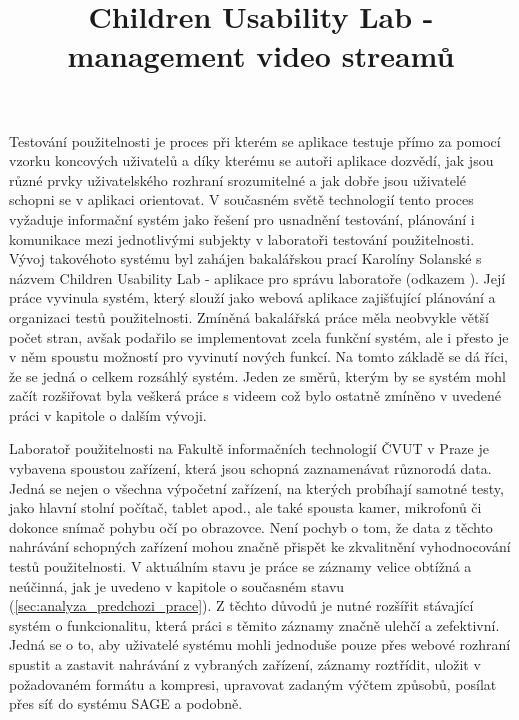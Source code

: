 \documentclass[thesis=M,czech]{FITthesis}[2012/06/26]
\title{Children Usability Lab - management video streamů}
\begin{document}

\begin{introduction}
Testování použitelnosti je proces při kterém se aplikace testuje přímo za pomocí vzorku koncových uživatelů a díky kterému 
se autoři aplikace dozvědí, jak jsou různé prvky uživatelského rozhraní srozumitelné a jak dobře jsou uživatelé schopni se v aplikaci orientovat. V současném světě technologií tento proces vyžaduje informační systém jako řešení pro usnadnění testování, plánování i komunikace mezi jednotlivými subjekty v laboratoři testování použitelnosti. Vývoj takovéhoto systému byl zahájen bakalářskou prací Karolíny Solanské s názvem Children Usability Lab - aplikace pro správu laboratoře (odkazem \cite{solankar}). Její práce vyvinula systém, který slouží jako webová aplikace zajišťující plánování a organizaci testů použitelnosti. Zmíněná bakalářská práce měla neobvykle větší počet stran, avšak podařilo se implementovat zcela funkční systém, ale i přesto je v něm spoustu možností pro vyvinutí nových funkcí. Na tomto základě se dá říci, že se jedná o celkem rozsáhlý systém. Jeden ze směrů, kterým by se systém mohl začít rozšiřovat byla veškerá práce s videem což bylo ostatně zmíněno v uvedené práci v kapitole o dalším vývoji.

Laboratoř použitelnosti na Fakultě informačních technologií ČVUT v Praze je vybavena spoustou zařízení, která jsou schopná zaznamenávat různorodá data. Jedná se nejen o všechna výpočetní zařízení, na kterých probíhají samotné testy, jako hlavní stolní počítač, tablet apod., ale také spousta kamer, mikrofonů či dokonce snímač pohybu očí po obrazovce. Není pochyb o tom, že data z těchto nahrávání schopných zařízení mohou značně přispět ke zkvalitnění vyhodnocování testů použitelnosti. V aktuálním stavu je práce se záznamy velice obtížná a neúčinná, jak je uvedeno v kapitole o současném stavu (\ref{sec:analyza_predchozi_prace}). Z těchto důvodů je nutné rozšířit stávající systém o funkcionalitu, která práci s těmito záznamy značně ulehčí a zefektivní. Jedná se o to, aby uživatelé systému mohli jednoduše pouze přes webové rozhraní spustit a zastavit nahrávání z vybraných zařízení, záznamy roztřídit, uložit v požadovaném formátu a kompresi, upravovat zadaným výčtem způsobů, posílat přes síť do systému SAGE a podobně.
\end{introduction}
\end{document}
